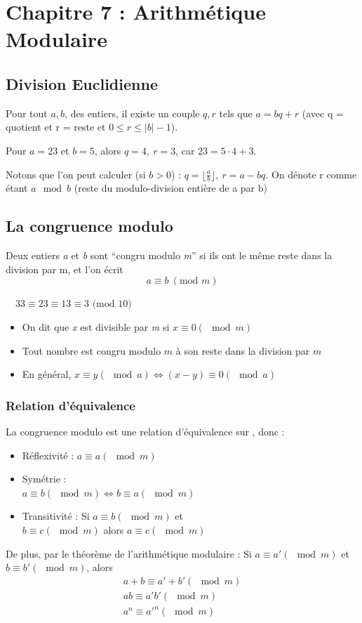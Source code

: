\documentclass[11pt,a4paper]{article}
\renewcommand{\)}{\right)}
\renewcommand{\(}{\left(}
\begin{document}
\section[Arithmétique Modulaire]{Chapitre 7 : Arithmétique Modulaire}
\subsection{Division Euclidienne}
Pour tout $a,b$, des entiers, il existe un couple $q,r$ tels que $a = bq + r$ (avec q = quotient et r = reste et $0 \leq r \leq |b|-1$). 
\begin{exemple}[0.7]
	Pour $a = 23$ et $b = 5$, alors $q = 4,\ r = 3$, car $23 = 5\cdot 4 + 3$.
\end{exemple}  Notons que l'on peut calculer (si $b > 0$) : $q = \lfloor\frac{a}{b}\rfloor,\ r = a-bq$. On dénote r comme étant $a \mod b$ (reste du modulo-division entière de a par b)
\subsection{La congruence modulo}
Deux entiers \textit{a} et \textit{b} sont \enquote{congru modulo \textit{m}} si ils ont le même reste dans la division par m, et l'on écrit 
\begin{equation*}
	a\equiv b\ (\text{mod } m)
\end{equation*}
\begin{exemple}[0.45]
	 $\quad 33 \equiv 23 \equiv 13 \equiv 3 \text{ (mod } 10)$
\end{exemple}
\begin{itemize}
	\item On dit que \textit{x} est divisible par \textit{m} si $x \equiv 0 ( \mod m)$
	\item Tout nombre est congru modulo $m$ à son reste dans la division par $m$
	\item En général, $x\equiv y (\mod a) \iff (x-y) \equiv 0 (\mod a)$
\end{itemize}
\subsubsection{Relation d'équivalence}
La congruence modulo est une relation d'équivalence sur \Z, donc :
\begin{multicols}{2}
	\begin{itemize}
		\item 	Réflexivité : $a \equiv a (\mod m)$
		\item 	Symétrie :\\ $a \equiv b (\mod m) \iff b \equiv a (\mod m)$
		\item 	Transitivité : Si $a \equiv b (\mod m)$ et \\$b \equiv c ( \mod m)$ alors $a \equiv c (\mod m)$
	\end{itemize}
\end{multicols}
De plus, par le théorème de l'arithmétique modulaire :
Si $a \equiv a' (\mod m)$ et $b \equiv b' (\mod m)$, alors
\begin{align*}
	a+ b \equiv a' + b' (\mod m)\\
	ab \equiv a'b' (\mod m)\\
	a^n \equiv  a'^n (\mod m)
\end{align*}
\end{document}
